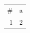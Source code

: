 \documentclass[11pt]{article}
\author{root}
\date{\today}
\title{}
\begin{document}
\tableofcontents

\begin{center}
\begin{tabular}{rr}
\# & a\\[0pt]
1 & 2\\[0pt]
\end{tabular}
\end{center}
\end{document}
